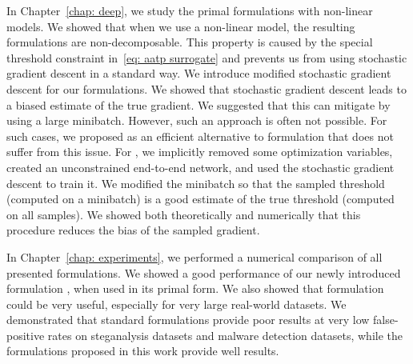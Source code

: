 In Chapter~\ref{chap: deep}, we study the primal formulations with non-linear models. We showed that when we use a non-linear model, the resulting formulations are non-decomposable. This property is caused by the special threshold constraint in~\eqref{eq: aatp surrogate} and prevents us from using stochastic gradient descent in a standard way. We introduce modified stochastic gradient descent for our formulations. We showed that stochastic gradient descent leads to a biased estimate of the true gradient. We suggested that this can mitigate by using a large minibatch. However, such an approach is often not possible. For such cases, we proposed \DeepTopPush as an efficient alternative to \TopPush formulation that does not suffer from this issue. For \DeepTopPush, we implicitly removed some optimization variables, created an unconstrained end-to-end network, and used the stochastic gradient descent to train it. We modified the minibatch so that the sampled threshold (computed on a minibatch) is a good estimate of the true threshold (computed on all samples). We showed both theoretically and numerically that this procedure reduces the bias of the sampled gradient.

In Chapter~\ref{chap: experiments}, we performed a numerical comparison of all presented formulations. We showed a good performance of our newly introduced formulation \PatMatNP, when used in its primal form. We also showed that \DeepTopPush formulation could be very useful, especially for very large real-world datasets. We demonstrated that standard formulations provide poor results at very low false-positive rates on steganalysis datasets and malware detection datasets, while the formulations proposed in this work provide well results.
